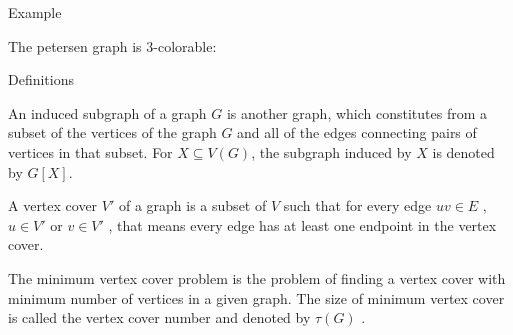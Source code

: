 \documentclass{beamer}
\begin{document}
\begin{frame}{Example}
\begin{example}
The petersen graph is $3$-colorable:

\begin{center}
\end{center}
\end{example}
\end{frame}

\begin{frame}{Definitions}
\begin{definition}
An \color{red} induced subgraph \color{black} of a graph $G$ is another graph, which constitutes from a subset of the vertices of the graph $G$ and all of the edges connecting pairs of vertices in that subset. For $X \subseteq V(G)$, the subgraph induced by $X$ is denoted by $G[X]$.
\end{definition}
\pause
\begin{definition}
A \color{red} vertex cover \color{black} $V'$ of a graph is a subset of $V$ such that for every edge $uv \in E$ , $u \in V'$ or $v \in V'$ , that means every edge has at least one endpoint in the vertex cover. 
\end{definition}
\pause
\begin{definition}
The \color{red} minimum vertex cover \color{black} problem is the problem of finding a vertex  cover with minimum number of vertices in a given graph. The size of minimum vertex cover is called the vertex cover number and denoted by $\tau(G)$ .
\end{definition}
\end{frame}
\end{document}
